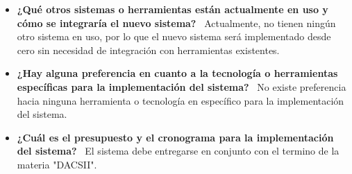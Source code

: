 \begin{itemize}
    \item \textbf{¿Qué otros sistemas o herramientas están actualmente en uso y cómo se integraría el nuevo sistema?} \ Actualmente, no tienen ningún otro sistema en uso, por lo que el nuevo sistema será implementado desde cero sin necesidad de integración con herramientas existentes.

    \item \textbf{¿Hay alguna preferencia en cuanto a la tecnología o herramientas específicas para la implementación del sistema?} \ No existe preferencia hacia ninguna herramienta o tecnología en específico para la implementación del sistema.

    \item \textbf{¿Cuál es el presupuesto y el cronograma para la implementación del sistema?} \ El sistema debe entregarse en conjunto con el termino de la materia "DACSII". 
\end{itemize}